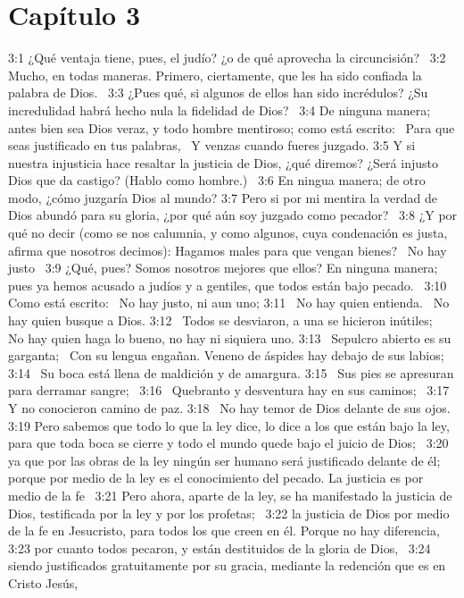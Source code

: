 \section*{Capítulo 3}

3:1 ¿Qué ventaja tiene, pues, el judío? ¿o de qué aprovecha la circuncisión?  
3:2 Mucho, en todas maneras. Primero, ciertamente, que les ha sido confiada la palabra de Dios.  
3:3 ¿Pues qué, si algunos de ellos han sido incrédulos? ¿Su incredulidad habrá hecho nula la fidelidad de Dios?  
3:4 De ninguna manera; antes bien sea Dios veraz, y todo hombre mentiroso; como está escrito:  
Para que seas justificado en tus palabras,  
Y venzas cuando fueres juzgado. 
3:5 Y si nuestra injusticia hace resaltar la justicia de Dios, ¿qué diremos? ¿Será injusto Dios que da castigo? (Hablo como hombre.)  
3:6 En ningua manera; de otro modo, ¿cómo juzgaría Dios al mundo? 
3:7 Pero si por mi mentira la verdad de Dios abundó para su gloria, ¿por qué aún soy juzgado como pecador?  
3:8 ¿Y por qué no decir (como se nos calumnia, y como algunos, cuya condenación es justa, afirma que nosotros decimos): Hagamos males para que vengan bienes?  
No hay justo  
3:9 ¿Qué, pues? Somos nosotros mejores que ellos? En ninguna manera; pues ya hemos acusado a judíos y a gentiles, que todos están bajo pecado.  
3:10 Como está escrito:  
No hay justo, ni aun uno; 
3:11  No hay quien entienda.  
No hay quien busque a Dios. 
3:12  Todos se desviaron, a una se hicieron inútiles;  
No hay quien haga lo bueno, no hay ni siquiera uno. 
3:13  Sepulcro abierto es su garganta;  
Con su lengua engañan. 
Veneno de áspides hay debajo de sus labios;  
3:14  Su boca está llena de maldición y de amargura. 
3:15  Sus pies se apresuran para derramar sangre;  
3:16  Quebranto y desventura hay en sus caminos;  
3:17  Y no conocieron camino de paz. 
3:18  No hay temor de Dios delante de sus ojos. 
3:19 Pero sabemos que todo lo que la ley dice, lo dice a los que están bajo la ley, para que toda boca se cierre y todo el mundo quede bajo el juicio de Dios;  
3:20 ya que por las obras de la ley ningún ser humano será justificado delante de él; porque por medio de la ley es el conocimiento del pecado. 
La justicia es por medio de la fe  
3:21 Pero ahora, aparte de la ley, se ha manifestado la justicia de Dios, testificada por la ley y por los profetas;  
3:22 la justicia de Dios por medio de la fe en Jesucristo, para todos los que creen en él. Porque no hay diferencia,  
3:23 por cuanto todos pecaron, y están destituidos de la gloria de Dios,  
3:24 siendo justificados gratuitamente por su gracia, mediante la redención que es en Cristo Jesús,  
